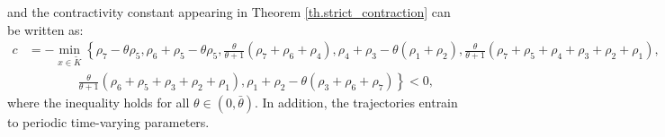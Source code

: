\documentclass[onefignum,onetabnum]{siamonline220329}
\newcommand{\wt}{\widetilde}
\begin{document}
{and the contractivity constant appearing in Theorem \ref{th.strict_contraction} can be written as:
{\footnotesize\begin{align*} c&= -\min_{x\in\wt K}\left\{ \rho_7 - \theta \rho_5, \rho_6+\rho_5 - \theta \rho_5, \frac{\theta}{\theta+1}(\rho_7+\rho_6+\rho_4),\rho_4+\rho_3-\theta(\rho_1+\rho_2), \frac{\theta}{\theta+1} (\rho_7+\rho_5+\rho_4+\rho_3+\rho_2+\rho_1), \right .\\ & \qquad \qquad \left . \frac{\theta}{\theta+1} (\rho_6+\rho_5+\rho_3+\rho_2+\rho_1), \rho_1+\rho_2 - \theta(\rho_3+\rho_6+\rho_7)\right \}<0, \end{align*}}
where the inequality holds for all $\theta \in(0,\bar\theta)$. 
 In addition, the trajectories  entrain to periodic time-varying parameters. 



}
\end{document}
